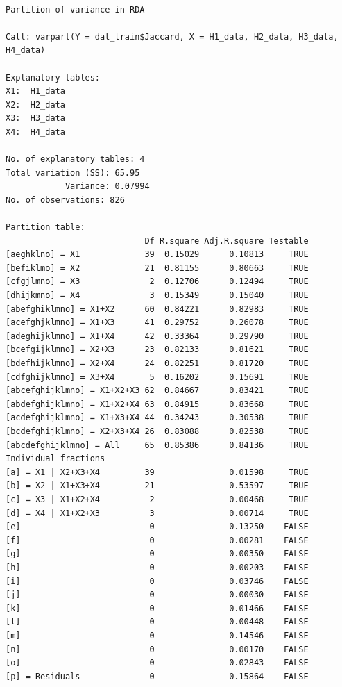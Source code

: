 \documentclass[
  letterpaper,
  DIV=11,
  numbers=noendperiod]{scrartcl}
\begin{document}
\begin{verbatim}

Partition of variance in RDA 

Call: varpart(Y = dat_train$Jaccard, X = H1_data, H2_data, H3_data,
H4_data)

Explanatory tables:
X1:  H1_data
X2:  H2_data
X3:  H3_data
X4:  H4_data 

No. of explanatory tables: 4 
Total variation (SS): 65.95 
            Variance: 0.07994 
No. of observations: 826 

Partition table:
                            Df R.square Adj.R.square Testable
[aeghklno] = X1             39  0.15029      0.10813     TRUE
[befiklmo] = X2             21  0.81155      0.80663     TRUE
[cfgjlmno] = X3              2  0.12706      0.12494     TRUE
[dhijkmno] = X4              3  0.15349      0.15040     TRUE
[abefghiklmno] = X1+X2      60  0.84221      0.82983     TRUE
[acefghjklmno] = X1+X3      41  0.29752      0.26078     TRUE
[adeghijklmno] = X1+X4      42  0.33364      0.29790     TRUE
[bcefgijklmno] = X2+X3      23  0.82133      0.81621     TRUE
[bdefhijklmno] = X2+X4      24  0.82251      0.81720     TRUE
[cdfghijklmno] = X3+X4       5  0.16202      0.15691     TRUE
[abcefghijklmno] = X1+X2+X3 62  0.84667      0.83421     TRUE
[abdefghijklmno] = X1+X2+X4 63  0.84915      0.83668     TRUE
[acdefghijklmno] = X1+X3+X4 44  0.34243      0.30538     TRUE
[bcdefghijklmno] = X2+X3+X4 26  0.83088      0.82538     TRUE
[abcdefghijklmno] = All     65  0.85386      0.84136     TRUE
Individual fractions                                         
[a] = X1 | X2+X3+X4         39               0.01598     TRUE
[b] = X2 | X1+X3+X4         21               0.53597     TRUE
[c] = X3 | X1+X2+X4          2               0.00468     TRUE
[d] = X4 | X1+X2+X3          3               0.00714     TRUE
[e]                          0               0.13250    FALSE
[f]                          0               0.00281    FALSE
[g]                          0               0.00350    FALSE
[h]                          0               0.00203    FALSE
[i]                          0               0.03746    FALSE
[j]                          0              -0.00030    FALSE
[k]                          0              -0.01466    FALSE
[l]                          0              -0.00448    FALSE
[m]                          0               0.14546    FALSE
[n]                          0               0.00170    FALSE
[o]                          0              -0.02843    FALSE
[p] = Residuals              0               0.15864    FALSE

\end{verbatim}
\end{document}
